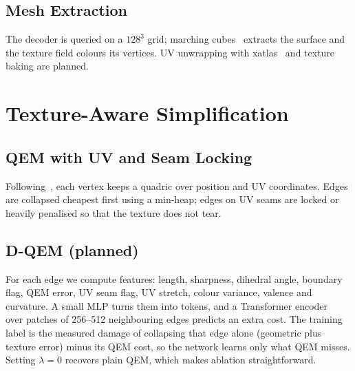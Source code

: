 \subsection{Mesh Extraction}
The decoder is queried on a $128^3$ grid; marching cubes~\cite{lorensen1987marching} extracts the surface and the texture field colours its vertices. UV unwrapping with xatlas~\cite{xatlas} and texture baking are planned.

\section{Texture-Aware Simplification}
\subsection{QEM with UV and Seam Locking}
Following~\cite{garland1997qem,garland1998color}, each vertex keeps a quadric over position and UV coordinates. Edges are collapsed cheapest first using a min-heap; edges on UV seams are locked or heavily penalised so that the texture does not tear.

\subsection{D-QEM (planned)}
For each edge we compute features: length, sharpness, dihedral angle, boundary flag, QEM error, UV seam flag, UV stretch, colour variance, valence and curvature. A small MLP turns them into tokens, and a Transformer encoder~\cite{vaswani2017attention} over patches of 256--512 neighbouring edges predicts an extra cost. The training label is the measured damage of collapsing that edge alone (geometric plus texture error) minus its QEM cost, so the network learns only what QEM misses. Setting $\lambda=0$ recovers plain QEM, which makes ablation straightforward.
